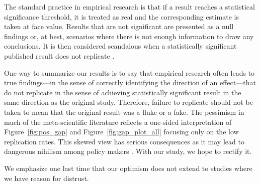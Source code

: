 \documentclass[11pt]{article}
\begin{document}


The standard practice in empirical research is that if a result reaches a statistical significance threshold, it is treated as real and the corresponding estimate is taken at face value. Results that are not significant are presented as a null findings or, at best, scenarios where there is not enough information to draw any conclusions. It is then considered scandalous when a statistically significant published result does not replicate \parencite{tversky1971}. 

One way to summarize our results is to say that empirical research often leads to true findings---in the sense of correctly identifying the direction of an effect---that do not replicate in the sense of achieving statistically significant result in the same direction as the original study.  Therefore, failure to replicate should not be taken to mean that the original result was a fluke or a fake. The pessimism in much of the meta-scientific literature reflects a one-sided interpretation of Figure~\ref{fig:pos_gap} and Figure~\ref{fig:gap_plot_all} focusing only on the low replication rates. This skewed view has serious consequences as it may lead to dangerous nihilism among policy makers \parencite{garisto2025trump}. With our study, we hope to rectify it.

We emphasize one last time that our optimism does not extend to studies where we have reason for distrust.

\end{document}
